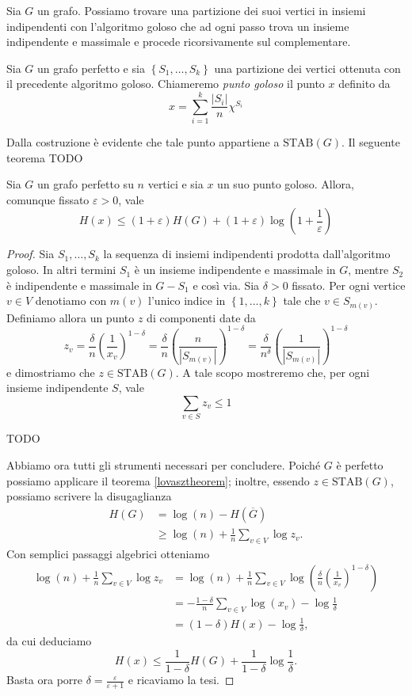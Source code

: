 Sia \(G\) un grafo. Possiamo trovare una partizione dei suoi vertici in insiemi indipendenti con l'algoritmo goloso che ad ogni passo trova un insieme indipendente e massimale e procede ricorsivamente sul complementare.
\begin{definition}
	Sia \(G\) un grafo perfetto e sia \(\left\{S_1,\dots,S_k\right\}\) una partizione dei vertici ottenuta con il precedente algoritmo goloso. Chiameremo \emph{punto goloso} il punto \(x\) definito da
	\[x=\sum_{i=1}^k\frac{|S_i|}{n}\chi^{S_i}\]
\end{definition}
Dalla costruzione è evidente che tale punto appartiene a \(\text{STAB}(G)\). Il seguente teorema TODO
\begin{theorem}
	Sia \(G\) un grafo perfetto su \(n\) vertici e sia \(x\) un suo punto goloso. Allora, comunque fissato \(\varepsilon>0\), vale
	\[H(x)\le(1+\varepsilon)H(G)+(1+\varepsilon)\log\left(1+\frac{1}{\varepsilon}\right)\]
\end{theorem}
\begin{proof}
	Sia \(S_1,\dots,S_k\) la sequenza di insiemi indipendenti prodotta dall'algoritmo goloso. In altri termini \(S_1\) è un insieme indipendente e massimale in \(G\), mentre \(S_2\) è indipendente e massimale in \(G-S_1\) e così via. Sia \(\delta>0\) fissato. Per ogni vertice \(v\in V\) denotiamo con \(m(v)\) l'unico indice in \(\left\{1,\dots,k\right\}\) tale che \(v\in S_{m(v)}\). Definiamo allora un punto \(z\) di componenti date da
	\[z_v=\frac{\delta}{n}\left(\frac{1}{x_v}\right)^{1-\delta}=\frac{\delta}{n}\left(\frac{n}{|S_{m(v)}|}\right)^{1-\delta}=\frac{\delta}{n^{\delta}}\left(\frac{1}{|S_{m(v)}|}\right)^{1-\delta}\]
	e dimostriamo che \(z\in\text{STAB}(G)\). A tale scopo mostreremo che, per ogni insieme indipendente \(S\), vale
	\[\sum_{v\in S}{z_v}\le 1\]
	
	TODO
	
	Abbiamo ora tutti gli strumenti necessari per concludere. Poiché \(G\) è perfetto possiamo applicare il teorema \ref{lovasztheorem}; inoltre, essendo \(z\in\text{STAB}(G)\), possiamo scrivere la disugaglianza
	\begin{align}
	  H(G)&=\log(n)-H(\overline{G}) \nonumber \\
	      &\ge \log(n) + \frac{1}{n}\sum_{v\in V}{\log{z_v}}.\nonumber
	\end{align}
	Con semplici passaggi algebrici otteniamo
	\begin{align}
	     \log(n) + \frac{1}{n}\sum_{v\in V}{\log{z_v}} &= \log(n) + \frac{1}{n}\sum_{v\in V}{\log\left(\frac{\delta}{n}\left(\frac{1}{x_v}\right)^{1-\delta}\right)} \nonumber \\
	      &= - \frac{1-\delta}{n}\sum_{v\in V}{\log(x_v)}-\log{\frac{1}{\delta}} \nonumber \\
	      &= (1-\delta)H(x)-\log{\frac{1}{\delta}} \nonumber,
	\end{align}
	da cui deduciamo
	\[H(x)\le\frac{1}{1-\delta}H(G)+\frac{1}{1-\delta}\log{\frac{1}{\delta}}.\]
	Basta ora porre \(\delta=\frac{\varepsilon}{\varepsilon+1}\) e ricaviamo la tesi.
\end{proof}
